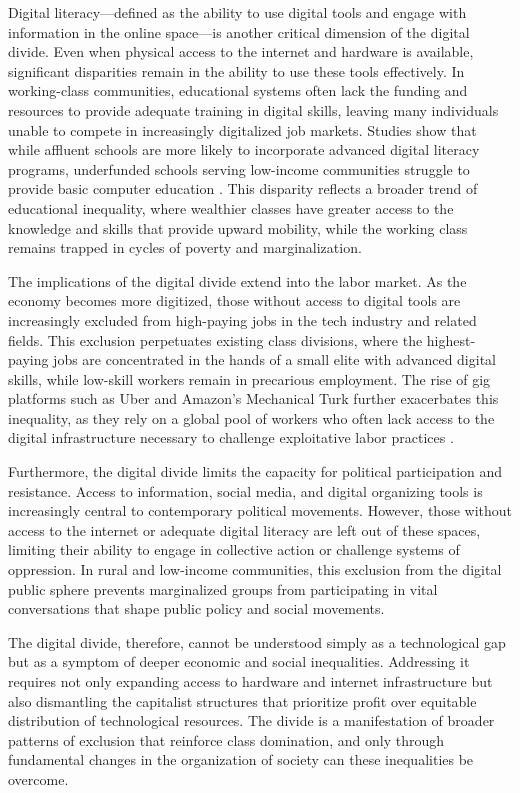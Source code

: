 \begin{refsection}
Digital literacy—defined as the ability to use digital tools and engage with information in the online space—is another critical dimension of the digital divide. Even when physical access to the internet and hardware is available, significant disparities remain in the ability to use these tools effectively. In working-class communities, educational systems often lack the funding and resources to provide adequate training in digital skills, leaving many individuals unable to compete in increasingly digitalized job markets. Studies show that while affluent schools are more likely to incorporate advanced digital literacy programs, underfunded schools serving low-income communities struggle to provide basic computer education \cite[pp.~90-93]{eubanksautomating}. This disparity reflects a broader trend of educational inequality, where wealthier classes have greater access to the knowledge and skills that provide upward mobility, while the working class remains trapped in cycles of poverty and marginalization.

The implications of the digital divide extend into the labor market. As the economy becomes more digitized, those without access to digital tools are increasingly excluded from high-paying jobs in the tech industry and related fields. This exclusion perpetuates existing class divisions, where the highest-paying jobs are concentrated in the hands of a small elite with advanced digital skills, while low-skill workers remain in precarious employment. The rise of gig platforms such as Uber and Amazon’s Mechanical Turk further exacerbates this inequality, as they rely on a global pool of workers who often lack access to the digital infrastructure necessary to challenge exploitative labor practices \cite[pp.~233-236]{schillerdigitalcapitalism}. 

Furthermore, the digital divide limits the capacity for political participation and resistance. Access to information, social media, and digital organizing tools is increasingly central to contemporary political movements. However, those without access to the internet or adequate digital literacy are left out of these spaces, limiting their ability to engage in collective action or challenge systems of oppression. In rural and low-income communities, this exclusion from the digital public sphere prevents marginalized groups from participating in vital conversations that shape public policy and social movements.

The digital divide, therefore, cannot be understood simply as a technological gap but as a symptom of deeper economic and social inequalities. Addressing it requires not only expanding access to hardware and internet infrastructure but also dismantling the capitalist structures that prioritize profit over equitable distribution of technological resources. The divide is a manifestation of broader patterns of exclusion that reinforce class domination, and only through fundamental changes in the organization of society can these inequalities be overcome.


\end{refsection}
